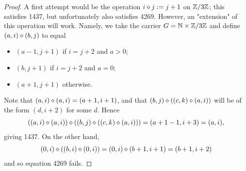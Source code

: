 \begin{proof} A first attempt would be the operation $i \diamond j := j+1$ on $\mathbb{Z}/3\mathbb{Z}$; this satisfies 1437, but unfortunately also satisfies 4269.  However, an "extension" of this operation will work. Namely, we take the carrier $G = \mathbb{N} \times \mathbb{Z}/3\mathbb{Z}$ and define $(a,i) \diamond (b,j)$ to equal
  \begin{itemize}
    \item $(a-1,j+1)$ if $i=j+2$ and $a>0$;
    \item $(b,j+1)$ if $i=j+2$ and $a=0$;
    \item $(a+1,j+1)$ otherwise.
  \end{itemize}
Note that $(a,i) \diamond (a,i) = (a+1,i+1)$, and that $(b,j) \diamond ((c,k) \diamond (a,i))$ will be of the form $(d,i+2)$ for some $d$.  Hence
$$ ((a,i) \diamond (a,i)) \diamond ((b,j) \diamond ((c,k) \diamond (a,i))) = (a+1-1, i+3) = (a,i),$$
giving 1437.  On the other hand,
$$ (0,i) \diamond ((b,i) \diamond (0,i)) = (0,i) \diamond (b+1,i+1) = (b+1,i+2)$$
and so equation 4269 fails.
\end{proof}
